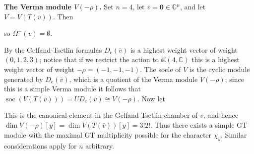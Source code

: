 \documentclass[11pt,fleqn]{amsart}
\newcommand\CC{\mathbb C}
\newcommand\vv{\overline{v}}
\begin{document}
\begin{Example*}
\textbf{The Verma module $V(-\rho)$.} Set $n = 4$, let $\vv = \mathbf{0} 
\in \CC^\mu$, and let $V = V(T(\vv))$. Then 


\noindent so $\Omega^-(\vv) = \emptyset$. 

By the Gelfand-Tsetlin formulas $D_e(\vv)$ is a highest weight vector of 
weight $(0,1,2,3)$; notice that if we restrict the action to 
$\mathfrak{sl(4,\CC)}$ this is a highest weight vector of weight $-\rho = 
(-1,-1,-1)$. The socle of $V$ is the cyclic module generated by $D_e(\vv)$, 
which is a quotient of the Verma module $V(-\rho)$; since this is a simple 
Verma module it follows that $\operatorname{soc}(V(T(\vv))) = U D_e(\vv) \cong 
V(-\rho)$. Now let


This is the canonical element in the Gelfand-Tsetlin chamber of $\vv$, and 
hence $\dim V(-\rho)[y] = \dim V(T(\vv))[y] = 3!2!$. Thus there exists a simple
GT module with the maximal GT multiplicity possible for the character $\chi_y$.
Similar considerations apply for $n$ arbitrary.
\end{Example*}
\end{document}
